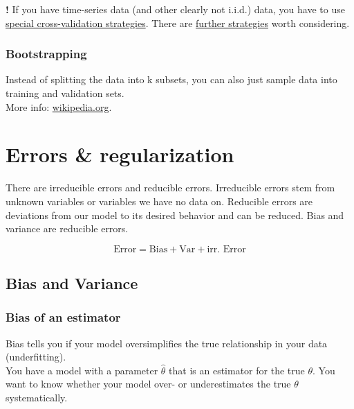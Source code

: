 \documentclass[
]{book}
\begin{document}
\textbf{!} If you have time-series data (and other clearly not i.i.d.) data,
you have to use \href{https://scikit-learn.org/stable/modules/cross_validation.html\#time-series-split}{special cross-validation
strategies}.
There are \href{https://scikit-learn.org/stable/modules/cross_validation.html\#time-series-split}{further
strategies}
worth considering.

\hypertarget{bootstrapping}{%
\subsubsection{Bootstrapping}\label{bootstrapping}}

Instead of splitting the data into k subsets, you can also just sample
data into training and validation sets.\\
More info:
\href{https://en.wikipedia.org/wiki/Bootstrapping_(statistics)}{wikipedia.org}.

\hypertarget{errors-regularization}{%
\section{Errors \& regularization}\label{errors-regularization}}

There are irreducible errors and reducible errors. Irreducible errors
stem from unknown variables or variables we have no data on. Reducible
errors are deviations from our model to its desired behavior and can be
reduced. Bias and variance are reducible errors.

\[\text{Error} = \text{Bias} + \text{Var} + \text{irr. Error}\]

\hypertarget{bias-and-variance}{%
\subsection{Bias and Variance}\label{bias-and-variance}}

\hypertarget{bias-of-an-estimator}{%
\subsubsection{Bias of an estimator}\label{bias-of-an-estimator}}

Bias tells you if your model oversimplifies the true relationship in
your data (underfitting).\\
You have a model with a parameter \(\hat{\theta}\) that is an estimator
for the true \(\theta\). You want to know whether your model over- or
underestimates the true \(\theta\) systematically.
\end{document}
